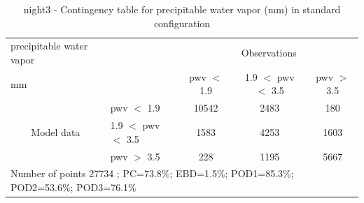 \begin{table}[p!]
\begin{center}
\begin{tabular}{llccc}
\hline
{precipitable water vapor}                                       &                                                    & \multicolumn{3}{c}{Observations}                 \\
{mm}                                       &                             & pwv $<$ 1.9   & 1.9 $<$ pwv $<$ 3.5 & pwv $>$ 3.5 \\
\hline
\multicolumn{1}{c}{\multirow{3}{*}{Model data}}  & pwv $<$ 1.9             & 10542                & 2483                       & 180              \\
                                                 & 1.9  $<$ pwv $<$ 3.5 & 1583                & 4253                       & 1603              \\
                                                 & pwv $>$ 3.5             & 228                & 1195                       & 5667              \\
\hline
\multicolumn{5}{l}{ Number of points        27734 ; PC=73.8\%; EBD=1.5\%; POD1=85.3\%; POD2=53.6\%; POD3=76.1\%}                 \\
\end{tabular}
\end{center}
\caption{night3 - Contingency table for  precipitable water vapor (mm) in standard configuration  }
\label{tab:contingencypwvBEF:night3}
\end{table}
